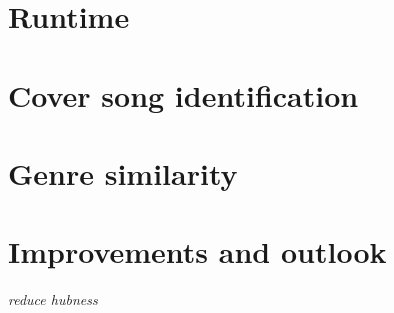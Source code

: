 \section{Runtime}

\section{Cover song identification}

\section{Genre similarity}

\section{Improvements and outlook}

\textit{reduce hubness}


